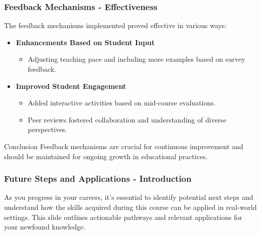 \documentclass[aspectratio=169]{beamer}
\begin{document}
\begin{frame}[fragile]
    \frametitle{Feedback Mechanisms - Effectiveness}
    The feedback mechanisms implemented proved effective in various ways:
    \begin{itemize}
        \item \textbf{Enhancements Based on Student Input} 
            \begin{itemize}
                \item Adjusting teaching pace and including more examples based on survey feedback.
            \end{itemize}
        \item \textbf{Improved Student Engagement} 
            \begin{itemize}
                \item Added interactive activities based on mid-course evaluations.
                \item Peer reviews fostered collaboration and understanding of diverse perspectives.
            \end{itemize}
    \end{itemize}

    \begin{block}{Conclusion}
        Feedback mechanisms are crucial for continuous improvement and should be maintained for ongoing growth in educational practices.
    \end{block}
\end{frame}

\begin{frame}[fragile]
    \frametitle{Future Steps and Applications - Introduction}
    As you progress in your careers, it’s essential to identify potential next steps and understand how the skills acquired during this course can be applied in real-world settings. This slide outlines actionable pathways and relevant applications for your newfound knowledge.
\end{frame}
\end{document}
